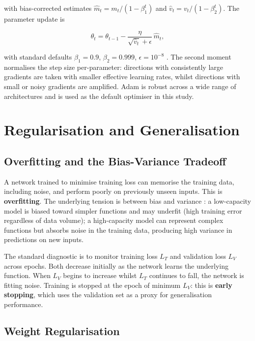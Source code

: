     with bias-corrected estimates $\hat{m}_t = m_t/(1 - \beta_1^t)$ and
    $\hat{v}_t = v_t/(1 - \beta_2^t)$. The parameter update is

    \[
    \theta_t = \theta_{t-1} - \frac{\eta}{\sqrt{\hat{v}_t} + \epsilon}\, \hat{m}_t,
    \]

    with standard defaults $\beta_1 = 0.9$, $\beta_2 = 0.999$, $\epsilon = 10^{-8}$
    \citep{kingma2015adam}. The second moment normalises the step size
    per-parameter: directions with consistently large gradients are taken with smaller
    effective learning rates, whilst directions with small or noisy gradients are
    amplified. Adam is robust across a wide range of architectures and is used as
    the default optimiser in this study.

    \section*{Regularisation and Generalisation}

    \subsection*{Overfitting and the Bias-Variance Tradeoff}

    A network trained to minimise training loss can memorise the training data,
    including noise, and perform poorly on previously unseen inputs. This is
    \textbf{overfitting}. The underlying tension is between bias and variance
    \citep{hastie2009elements}: a low-capacity model is biased toward simpler
    functions and may underfit (high training error regardless of data volume);
    a high-capacity model can represent complex functions but absorbs noise in
    the training data, producing high variance in predictions on new inputs.

    The standard diagnostic is to monitor training loss $L_T$ and validation loss
    $L_V$ across epochs. Both decrease initially as the network learns the underlying
    function. When $L_V$ begins to increase whilst $L_T$ continues to fall, the
    network is fitting noise. Training is stopped at the epoch of minimum $L_V$:
    this is \textbf{early stopping}, which uses the validation set as a proxy for
    generalisation performance.

    \subsection*{Weight Regularisation}

